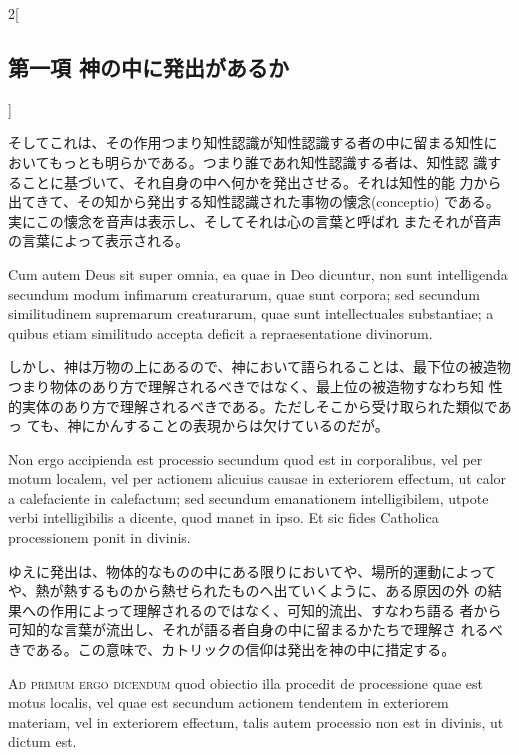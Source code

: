 \documentclass[paper=a4paper,fontsize=10pt,jafontsize=9pt,titlepage]{jlreq}
\begin{document}
\begin{paracol}{2}[\subsection{第一項 神の中に発出があるか}]
\switchcolumn


そしてこれは、その作用つまり知性認識が知性認識する者の中に留まる知性に
 おいてもっとも明らかである。つまり誰であれ知性認識する者は、知性認
 識することに基づいて、それ自身の中へ何かを発出させる。それは知性的能
 力から出てきて、その知から発出する知性認識された事物の懐念(conceptio)
 である。実にこの懐念を音声は表示し、そしてそれは心の言葉と呼ばれ
またそれが音声の言葉によって表示される。


\switchcolumn*


Cum autem Deus sit super omnia, ea quae in Deo dicuntur,
non sunt intelligenda secundum modum infimarum creaturarum, quae sunt
corpora; sed secundum similitudinem supremarum creaturarum, quae sunt
intellectuales substantiae; a quibus etiam similitudo accepta deficit a
repraesentatione divinorum.


\switchcolumn


しかし、神は万物の上にあるので、神において語られることは、最下位の被造物
つまり物体のあり方で理解されるべきではなく、最上位の被造物すなわち知
 性的実体のあり方で理解されるべきである。ただしそこから受け取られた類似であっ
 ても、神にかんすることの表現からは欠けているのだが。


\switchcolumn*


Non ergo accipienda est processio secundum
quod est in corporalibus, vel per motum localem, vel per actionem
alicuius causae in exteriorem effectum, ut calor a calefaciente in
calefactum; sed secundum emanationem intelligibilem, utpote verbi
intelligibilis a dicente, quod manet in ipso. Et sic fides Catholica
processionem ponit in divinis.


\switchcolumn


ゆえに発出は、物体的なものの中にある限りにおいてや、場所的運動によって
 や、熱が熱するものから熱せられたものへ出ていくように、ある原因の外
 の結果への作用によって理解されるのではなく、可知的流出、すなわち語る
 者から可知的な言葉が流出し、それが語る者自身の中に留まるかたちで理解さ
 れるべきである。この意味で、カトリックの信仰は発出を神の中に措定する。


\switchcolumn*[\subsection{ad.1}]


{\scshape Ad primum ergo dicendum} quod obiectio illa procedit de processione quae
est motus localis, vel quae est secundum actionem tendentem in
exteriorem materiam, vel in exteriorem effectum, talis autem processio
non est in divinis, ut dictum est.



\end{paracol}
\end{document}
